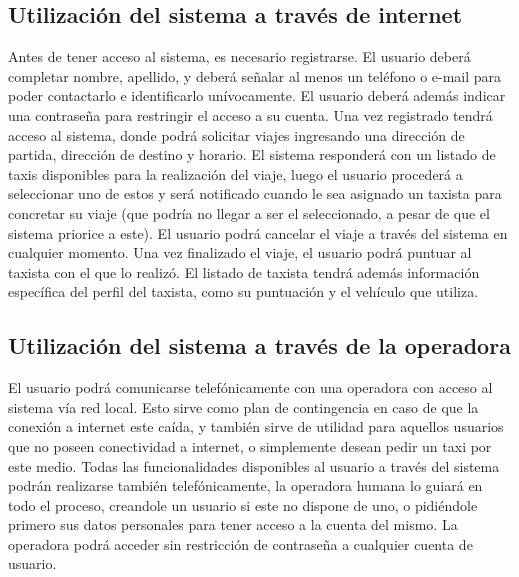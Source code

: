 \subsection{Utilización del sistema a través de internet}
Antes de tener acceso al sistema, es necesario registrarse. El usuario deberá completar nombre, apellido, y deberá señalar al menos un teléfono o e-mail para poder contactarlo e identificarlo unívocamente. El usuario deberá además indicar una contraseña para restringir el acceso a su cuenta. Una vez registrado tendrá acceso al sistema, donde podrá solicitar viajes ingresando una dirección de partida, dirección de destino y horario. El sistema responderá con un listado de taxis disponibles para la realización del viaje, luego el usuario procederá a seleccionar uno de estos y será notificado cuando le sea asignado un taxista para concretar su viaje (que podría no llegar a ser el seleccionado, a pesar de que el sistema priorice a este). El usuario podrá cancelar el viaje a través del sistema en cualquier momento. Una vez finalizado el viaje, el usuario podrá puntuar al taxista con el que lo realizó. El listado de taxista tendrá además información específica del perfil del taxista, como su puntuación y el vehículo que utiliza.

\subsection{Utilización del sistema a través de la operadora}
El usuario podrá comunicarse telefónicamente con una operadora con acceso al sistema vía red local. Esto sirve como plan de contingencia en caso de que la conexión a internet este caída, y también sirve de utilidad para aquellos usuarios que no poseen conectividad a internet, o simplemente desean pedir un taxi por este medio. Todas las funcionalidades disponibles al usuario a través del sistema podrán realizarse también telefónicamente, la operadora humana lo guiará en todo el proceso, creandole un usuario si este no dispone de uno, o pidiéndole primero sus datos personales para tener acceso a la cuenta del mismo. La operadora podrá acceder sin restricción de contraseña a cualquier cuenta de usuario.

